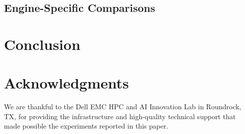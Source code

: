 \documentclass{IEEEtran}
\begin{document}


\subsection{Engine-Specific Comparisons}


\section{Conclusion} %
\label{sec:conclusion}




\section{Acknowledgments}

We are thankful to the Dell EMC HPC and AI Innovation Lab
in Roundrock, TX, for providing the infrastructure and high-quality
technical support that made possible the experiments reported in this paper.

 

\end{document}
